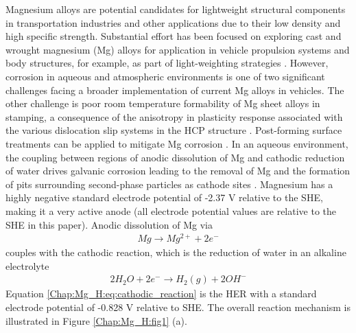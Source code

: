 Magnesium alloys are potential candidates for lightweight structural components in transportation industries and other applications due to their low density and high specific strength. Substantial effort has been focused on exploring cast and wrought magnesium (Mg) alloys for application in vehicle propulsion systems and body structures, for example, as part of light-weighting strategies \cite{luo2005development, luo2006wrought,carter2011structural, jekl2015development, luo2013magnesium}. However, corrosion in aqueous and atmospheric environments is one of two significant challenges facing a broader implementation of current Mg alloys in vehicles. The other challenge is poor room temperature formability of Mg sheet alloys in stamping, a consequence of the anisotropy in plasticity response associated with the various dislocation slip systems in the \ac{HCP} structure \cite{yasi2010first}. Post-forming surface treatments can be applied to mitigate Mg corrosion \cite{zheng2005corrosion}.
In an aqueous environment, the coupling between regions of anodic dissolution of Mg and cathodic reduction of water drives galvanic corrosion leading to the removal of Mg and the formation of pits surrounding second-phase particles as cathode sites \cite{birbilis2014evidence, zeng2006review}. Magnesium has a highly negative standard electrode potential of -2.37 V relative to the \ac{SHE}, making it a very active anode (all electrode potential values are relative to the \ac{SHE} in this paper). Anodic dissolution of Mg via
\begin{align}
Mg \rightarrow Mg^{2+} + 2e^{-}
 \label{Chap:Mg_H:eq:anodic_dissolution}
\end{align}
couples with the cathodic reaction, which is the reduction of water in an alkaline electrolyte
\begin{align}
2H_2O + 2e^{-} \rightarrow H_{2}(g) + 2OH^{-}
 \label{Chap:Mg_H:eq:cathodic_reaction}
\end{align}
Equation \ref{Chap:Mg_H:eq:cathodic_reaction} is the \ac{HER} with a standard electrode potential of -0.828 V relative to \ac{SHE}. The overall reaction mechanism is illustrated in Figure \ref{Chap:Mg_H:fig1} (a).

